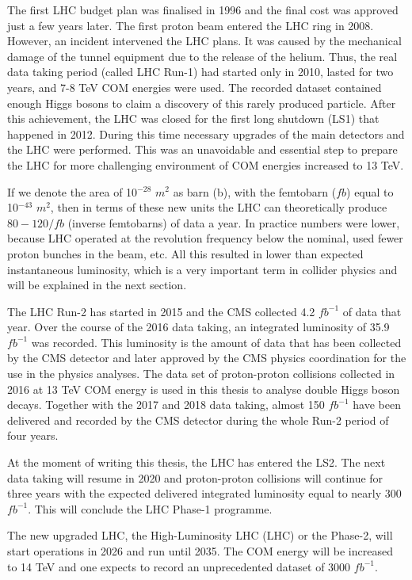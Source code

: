 \begin{normalsize}
The first LHC budget plan was finalised in 1996 and the final cost was approved just a few years later. The first proton beam entered the LHC ring in 2008. However, an incident intervened the LHC plans. It was caused by the mechanical damage of the tunnel equipment due to the release of the helium. Thus, the real data taking period (called LHC Run-1) had started only in 2010, lasted for two years, and 7-8 TeV COM energies were used. The recorded dataset contained enough Higgs bosons to claim a discovery of this rarely produced particle. After this achievement, the LHC was closed for the first long shutdown (LS1) that happened in 2012. During this time necessary upgrades of the main detectors and the LHC were performed. This was an unavoidable and essential step to prepare the LHC for more challenging environment of COM energies increased to 13 TeV. 


If we denote the area of 10$^{-28}$ $m^2$ as barn (b), with the femtobarn ($fb$) equal to 10$^{-43}$ $m^2$, then in terms of these new units the LHC can theoretically produce $80-120/fb$ (inverse femtobarns) of data a year. In practice numbers were lower, because LHC operated at the revolution frequency below the nominal, used fewer proton bunches in the beam, etc.  All this resulted in lower than expected instantaneous luminosity, which is a very important term in collider physics and will be explained in the next section.

The LHC Run-2 has started in 2015 and the CMS collected 4.2 $fb^{-1}$ of data that year. Over the course of the 2016 data taking, an integrated luminosity of 35.9 $fb^{-1}$ was recorded. This luminosity is the amount of data that has been collected by the CMS detector and later approved by the CMS physics coordination for the use in the physics analyses. The data set of proton-proton collisions collected in 2016 at 13 TeV COM energy is used in this thesis to analyse double Higgs boson decays. Together with the 2017 and 2018 data taking, almost 150 $fb^{-1}$ have been delivered and recorded by the CMS detector during the whole Run-2 period of four years. 

At the moment of writing this thesis, the LHC has entered the LS2. The next data taking will resume in 2020 and proton-proton collisions will continue for three years with the expected delivered integrated luminosity equal to nearly 300 $fb^{-1}$. This will conclude the LHC Phase-1 programme. 

The new upgraded LHC, the High-Luminosity LHC (LHC) or the Phase-2, will start operations in 2026 and run until 2035. The COM energy will be increased to 14 TeV and one expects to record an unprecedented dataset of 3000 $fb^{-1}$. 


\end{normalsize}
